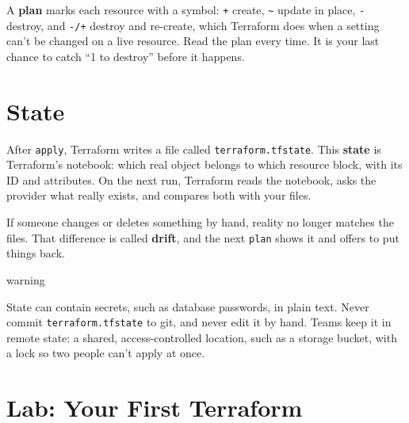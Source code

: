 A \textbf{plan} marks each resource with a symbol: \texttt{+} create, \texttt{\textasciitilde{}} update in place, \texttt{-} destroy, and \texttt{-/+} destroy and re-create, which Terraform does when a setting can't be changed on a live resource. Read the plan every time. It is your last chance to catch ``1 to destroy'' before it happens.

\section{State}\label{08-infrastructure-as-code:state}

After \texttt{apply}, Terraform writes a file called \texttt{terraform.tfstate}. This \textbf{state} is Terraform's notebook: which real object belongs to which resource block, with its ID and attributes. On the next run, Terraform reads the notebook, asks the provider what really exists, and compares both with your files.

If someone changes or deletes something by hand, reality no longer matches the files. That difference is called \textbf{drift}, and the next \texttt{plan} shows it and offers to put things back.

\begin{callout}{warning}

State can contain secrets, such as database passwords, in plain text. Never commit \texttt{terraform.tfstate} to git, and never edit it by hand. Teams keep it in remote state: a shared, access-controlled location, such as a storage bucket, with a lock so two people can't apply at once.

\end{callout}

\section{Lab: Your First Terraform}\label{08-infrastructure-as-code:lab-your-first-terraform}

